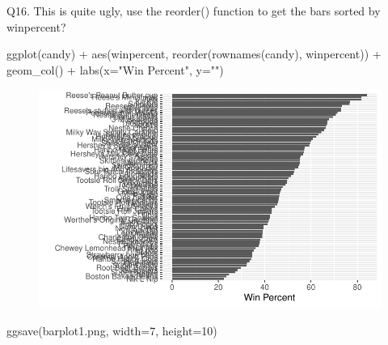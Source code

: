 \documentclass[
  letterpaper,
  DIV=11,
  numbers=noendperiod]{scrartcl}
\newenvironment{Shaded}{\begin{snugshade}}{\end{snugshade}}
\newcommand{\AttributeTok}[1]{\textcolor[rgb]{0.40,0.45,0.13}{#1}}
\newcommand{\DecValTok}[1]{\textcolor[rgb]{0.68,0.00,0.00}{#1}}
\newcommand{\FunctionTok}[1]{\textcolor[rgb]{0.28,0.35,0.67}{#1}}
\newcommand{\NormalTok}[1]{\textcolor[rgb]{0.00,0.23,0.31}{#1}}
\newcommand{\SpecialCharTok}[1]{\textcolor[rgb]{0.37,0.37,0.37}{#1}}
\newcommand{\StringTok}[1]{\textcolor[rgb]{0.13,0.47,0.30}{#1}}
\begin{document}
Q16. This is quite ugly, use the reorder() function to get the bars
sorted by winpercent?

\begin{Shaded}
\begin{Highlighting}[]
\FunctionTok{ggplot}\NormalTok{(candy) }\SpecialCharTok{+} 
  \FunctionTok{aes}\NormalTok{(winpercent, }\FunctionTok{reorder}\NormalTok{(}\FunctionTok{rownames}\NormalTok{(candy), winpercent)) }\SpecialCharTok{+} 
  \FunctionTok{geom\_col}\NormalTok{() }\SpecialCharTok{+} 
  \FunctionTok{labs}\NormalTok{(}\AttributeTok{x=}\StringTok{"Win Percent"}\NormalTok{, }\AttributeTok{y=}\StringTok{""}\NormalTok{)}
\end{Highlighting}
\end{Shaded}

\begin{figure}[H]

{\centering \includegraphics{Class-9_files/figure-pdf/unnamed-chunk-18-1.pdf}

}

\end{figure}

\begin{Shaded}
\begin{Highlighting}[]
\FunctionTok{ggsave}\NormalTok{(}\StringTok{\textquotesingle{}barplot1.png\textquotesingle{}}\NormalTok{, }\AttributeTok{width=}\DecValTok{7}\NormalTok{, }\AttributeTok{height=}\DecValTok{10}\NormalTok{)}
\end{Highlighting}
\end{Shaded}
\end{document}
